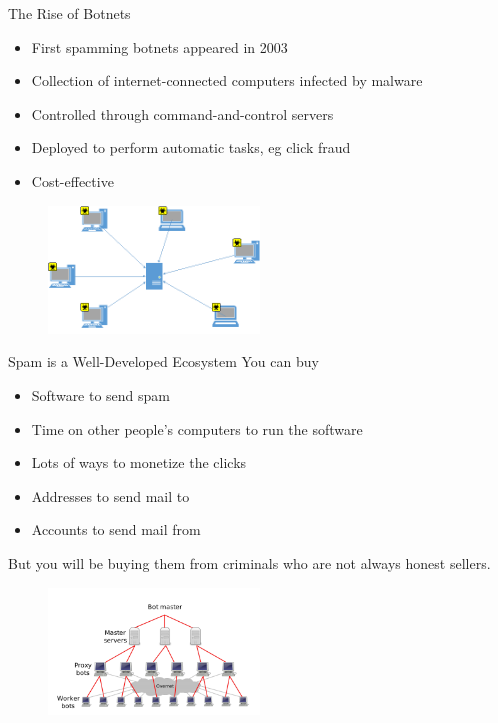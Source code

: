 \documentclass[nobackground,dvipsnames,table]{beamer}
\begin{document}
\begin{frame}{The Rise of Botnets}
    \begin{itemize}
        \item First spamming botnets appeared in 2003
        \item Collection of internet-connected computers infected by malware
        \item Controlled through command-and-control servers
        \item Deployed to perform automatic tasks, eg click fraud 
        \item Cost-effective
    \end{itemize}
    \begin{figure}
        \centering
        \includegraphics[width=0.5\textwidth]{botnet}
    \end{figure}
\end{frame}

\begin{frame}{Spam is a Well-Developed Ecosystem}
    You can buy
    \begin{itemize}
        \item Software to send spam
        \item Time on other people’s computers to run the software
        \item Lots of ways to monetize the clicks
        \item Addresses to send mail to
        \item Accounts to send mail from
    \end{itemize}
    But you will be buying them from criminals who are not always honest sellers.
    \begin{figure}
        \includegraphics[width=0.5\textwidth, right]{botnet-structure}
    \end{figure}
\end{frame}
\end{document}
